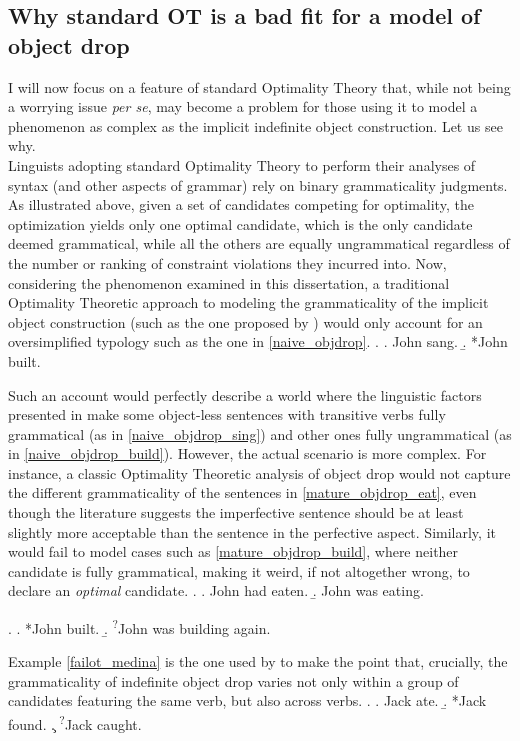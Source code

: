 \subsection{Why standard OT is a bad fit for a model of object drop} 
I will now focus on a feature of standard Optimality Theory that, while not being a worrying issue \textit{per se}, may become a problem for those using it to model a phenomenon as complex as the implicit indefinite object construction. Let us see why.\\
Linguists adopting standard Optimality Theory to perform their analyses of syntax (and other aspects of grammar) rely on binary grammaticality judgments. As illustrated above, given a set of candidates competing for optimality, the optimization yields only one optimal candidate, which is the only candidate deemed grammatical, while all the others are equally ungrammatical regardless of the number or ranking of constraint violations they incurred into. Now, considering the phenomenon examined in this dissertation, a traditional Optimality Theoretic approach to modeling the grammaticality of the implicit object construction (such as the one proposed by \textcite{yankes2021objectdropot}) would only account for an oversimplified typology such as the one in \ref{naive_objdrop}. 
\ex. \label{naive_objdrop} \a. \label{naive_objdrop_sing} John sang.
\b. \label{naive_objdrop_build} *John built.

Such an account would perfectly describe a world where the linguistic factors presented in  make some object-less sentences with transitive verbs fully grammatical (as in \ref{naive_objdrop_sing}) and other ones fully ungrammatical (as in \ref{naive_objdrop_build}). However, the actual scenario is more complex. For instance, a classic Optimality Theoretic analysis of object drop would not capture the different grammaticality of the sentences in \ref{mature_objdrop_eat}, even though the literature suggests the imperfective sentence should be at least slightly more acceptable than the sentence in the perfective aspect. Similarly, it would fail to model cases such as \ref{mature_objdrop_build}, where neither candidate is fully grammatical, making it weird, if not altogether wrong, to declare an \textit{optimal} candidate.
\ex. \label{mature_objdrop_eat} \a. John had eaten.
\b. John was eating.

\ex. \label{mature_objdrop_build} \a. *John built.
\b. \textsuperscript{?}John was building again.

Example \ref{failot_medina} is the one used by \textcite[62]{Medina2007} to make the point that, crucially, the grammaticality of indefinite object drop varies not only within a group of candidates featuring the same verb, but also across verbs.
\ex. \label{failot_medina} \a. Jack ate.
\b. *Jack found.
\c. \textsuperscript{?}Jack caught.


